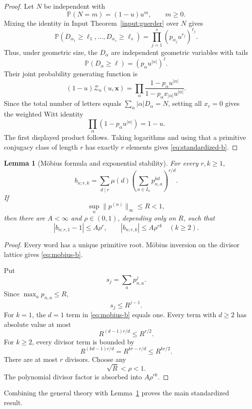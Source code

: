 \documentclass[11pt]{article}
\newtheorem{lemma}[theorem]{Lemma}
\theoremstyle{definition}
\theoremstyle{remark}
\newcommand{\Pp}{\mathbb P}
\newcommand{\cZ}{\mathcal Z}
\begin{document}
\begin{proof}
Let $N$ be independent with
\[
 \Pp(N=m)=(1-u)u^m,\qquad m\ge0.
\]
Mixing the identity in Input Theorem~\ref{input:guerder} over $N$ gives
\[
 \Pp(D_{\alpha_1}\ge\ell_1,\ldots,D_{\alpha_s}\ge\ell_s)
 =
 \prod_{j=1}^s(p_{\alpha_j}u^{r_j})^{\ell_j}.
\]
Thus, under geometric size, the $D_\alpha$ are independent geometric
variables with tails
\[
 \Pp(D_\alpha\ge\ell)=(p_\alpha u^{|\alpha|})^\ell.
\]
Their joint probability generating function is
\[
 (1-u)\cZ_n(u,\mathbf x)
 =
 \prod_\alpha
 \frac{1-p_\alpha u^{|\alpha|}}
      {1-p_\alpha x_{|\alpha|}u^{|\alpha|}}.
\]
Since the total number of letters equals
$\sum_\alpha|\alpha|D_\alpha=N$, setting all $x_r=0$ gives the weighted
Witt identity
\[
 \prod_\alpha(1-p_\alpha u^{|\alpha|})=1-u.
\]
The first displayed product follows.  Taking logarithms and using that a
primitive conjugacy class of length $r$ has exactly $r$ elements gives
\eqref{eq:standardized-b}.
\end{proof}

\begin{lemma}[M\"obius formula and exponential stability]
\label{lem:standardized-stability}
For every $r,k\ge1$,
\begin{equation}\label{eq:mobius-b}
 b_{n;r,k}
 =
 \sum_{d\mid r}\mu(d)
 \left(\sum_{a\in I_n}p_{n,a}^{kd}\right)^{r/d}.
\end{equation}
If
\[
 \sup_n\|p^{(n)}\|_\infty\le R<1,
\]
then there are $A<\infty$ and $\rho\in(0,1)$, depending only on $R$, such
that
\[
 |b_{n;r,1}-1|\le A\rho^r,
 \qquad
 |b_{n;r,k}|\le A\rho^{rk}\quad(k\ge2).
\]
\end{lemma}

\begin{proof}
Every word has a unique primitive root.  M\"obius inversion on the divisor
lattice gives \eqref{eq:mobius-b}.

Put
\[
 s_j=\sum_a p_{n,a}^j.
\]
Since $\max_ap_{n,a}\le R$,
\[
 s_j\le R^{j-1}.
\]
For $k=1$, the $d=1$ term in \eqref{eq:mobius-b} equals one.  Every term
with $d\ge2$ has absolute value at most
\[
 R^{(d-1)r/d}\le R^{r/2}.
\]
For $k\ge2$, every divisor term is bounded by
\[
 R^{(kd-1)r/d}=R^{kr-r/d}\le R^{kr/2}.
\]
There are at most $r$ divisors.  Choose any
\[
 \sqrt R<\rho<1.
\]
The polynomial divisor factor is absorbed into $A\rho^{rk}$.
\end{proof}

Combining the general theory with
Lemma~\ref{lem:standardized-stability} proves the main standardized result.
\end{document}
